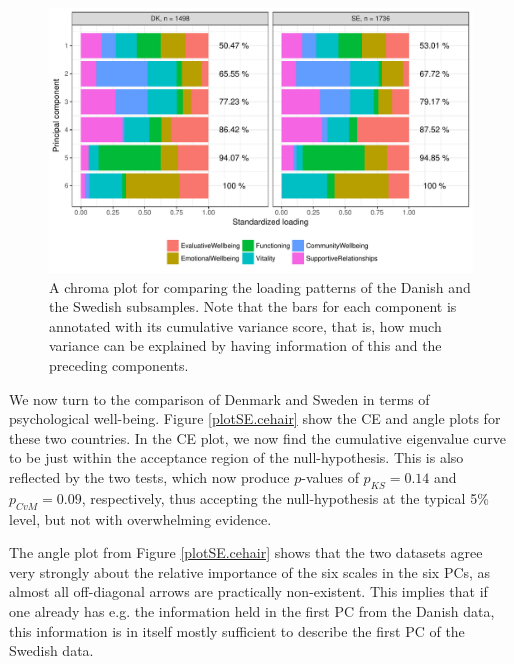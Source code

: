 \documentclass[titlepage,11pt,twoside]{article}
\newcommand{\hl}[1]{\textcolor{magenta}{#1}}
\begin{document}
\begin{figure}
\center
\includegraphics[scale = 0.7]{essDKSEpancake.pdf}
\caption{A chroma plot for comparing the loading patterns of the Danish and the Swedish subsamples. Note that the bars for each component is annotated with its cumulative variance score, that is, how much variance can be explained by having information of this and the preceding components.}
\label{plotSE.pancake}
\end{figure}


We now turn to the comparison of Denmark and Sweden in terms of psychological well-being. Figure \ref{plotSE.cehair} show the CE and angle plots for these two countries. In the CE plot, we now find the cumulative eigenvalue curve to be just within the acceptance region of the null-hypothesis. This is also reflected by the two tests, which now produce $p$-values of $p_{KS} = 0.14$ and $p_{CvM} = 0.09$, respectively, thus accepting the null-hypothesis at the typical 5\% level, but not with overwhelming evidence. 

The angle plot from Figure \ref{plotSE.cehair} shows that the two datasets agree very strongly about the relative importance of the six scales in the six PCs, as almost all off-diagonal arrows are practically non-existent. This implies that if one already has e.g. the information held in the first PC from the Danish data, this information is in itself mostly sufficient to describe the first PC of the Swedish data. 
\end{document}
